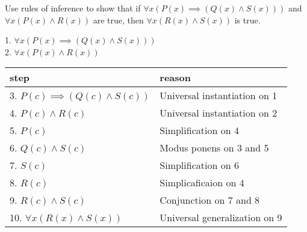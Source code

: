 \documentclass[a4paper]{exam}
\begin{document}
\begin{questions}
\begin{solution}
  \end{solution}    
  
  \question Use rules of inference to show that if $\forall x(P(x) \implies (Q(x) \land S(x)))$ and $\forall x(P(x) \land R(x))$ are true, then $\forall x(R(x) \land S(x))$ is true.
  \begin{solution}
      1. $\forall x(P(x) \implies (Q(x) \land S(x)))$\\
      2. $\forall x(P(x) \land R(x))$\\
      \begin{tabular}{|l|l|}
        \hline
        step & reason\\
        \hline
        3. $P(c) \implies (Q(c) \land S(c))$ & Universal instantiation on 1 \\
        4. $P(c) \land R(c)$ & Universal instantiation on 2\\
        5. $P(c)$ & Simplification on 4 \\
        6. $Q(c) \land S(c)$ & Modus ponens on 3 and 5\\
        7. $S(c)$ & Simplification on 6\\
        8. $R(c)$ & Simplicaficaion on 4\\
        9. $R(c) \land S(c)$ & Conjunction on 7 and 8\\
        10. $\forall x (R(x) \land S(x))$ & Universal generalization on 9 \\
        \hline
      \end{tabular}

    \end{solution}

\end{questions}
\end{document}
